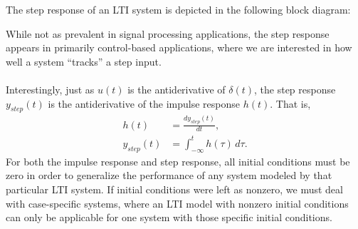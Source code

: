 \documentclass{report}
\begin{document}
The step response of an LTI system is depicted in the following block diagram:
\begin{center}
\end{center}
While not as prevalent in signal processing applications, the step response appears in primarily control-based applications, where 
we are interested in how well a system ``tracks'' a step input.
\\ \\
Interestingly, just as $u(t)$ is the antiderivative of $\delta(t)$, the step response $y_{step}(t)$ is the antiderivative of the impulse response $h(t)$. That is,
\begin{align}
    h(t) &= \frac{dy_{step}(t)}{dt}, \\
    y_{step}(t) &= \int_{-\infty}^{t} h(\tau) \,d\tau.
\end{align}
For both the impulse response and step response, all initial conditions must be zero in order to generalize the performance of any system modeled 
by that particular LTI system. If initial conditions were left as nonzero, we must deal with case-specific systems, where an LTI model with nonzero initial 
conditions can only be applicable for one system with those specific initial conditions. 
\end{document}
